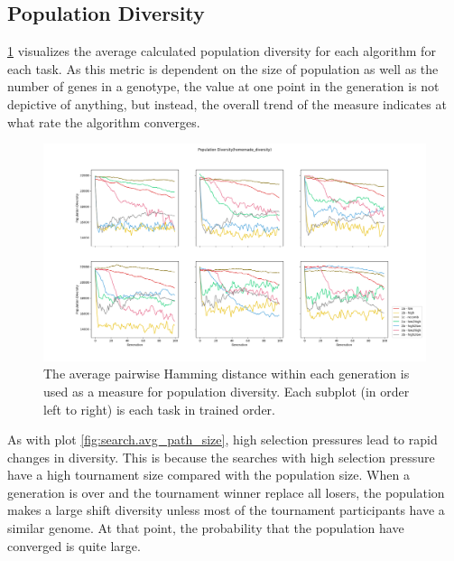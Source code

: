 \subsection{Population Diversity}
\ref{fig:search.hamming_diversity} visualizes the average calculated population diversity for each algorithm for each task. As this metric is dependent on the size of population as well as the number of genes in a genotype, the value at one point in the generation is not depictive of anything, but instead, the overall trend of the measure indicates at what rate the algorithm converges. 

\begin{figure}[h]
    \includegraphics[width=\textwidth]{Chapters/Experiments/search_algo/figures/Average_population_diversity_reduced_hamming.png}
    \caption{The average pairwise Hamming distance within each generation is used as a measure for population diversity. Each subplot (in order left to right) is each task in trained order.}
    \label{fig:search.hamming_diversity}
\end{figure}

As with plot \ref{fig:search.avg_path_size}, high selection pressures lead to rapid changes in diversity. This is because the searches with high selection pressure have a high tournament size compared with the population size. When a generation is over and  the tournament winner replace all losers, the population makes a large shift diversity unless most of the tournament participants have a similar genome. At that point, the probability that the population have converged is quite large. 

